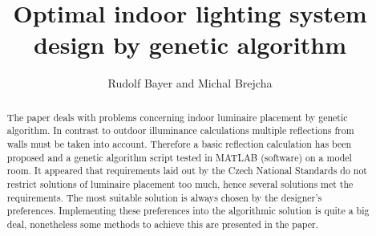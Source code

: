 \documentclass[Afour,sagev,times,doublespace]{sagej}
\begin{document}

\title{Optimal indoor lighting system design by genetic algorithm}

\author{Rudolf Bayer and Michal Brejcha}




\begin{abstract}
The paper deals with problems concerning indoor luminaire placement by genetic algorithm. In contrast to outdoor illuminance calculations multiple reflections from walls must be taken into account. Therefore a basic reflection calculation has been proposed and a genetic algorithm script tested in MATLAB (software) on a model room. It appeared that requirements laid out by the Czech National Standards do not restrict solutions of luminaire placement too much, hence several solutions met the requirements. The most suitable solution is always chosen by the designer's preferences. Implementing these preferences into the algorithmic solution is quite a big deal, nonetheless some methods to achieve this are presented in the paper.
\end{abstract}


\maketitle









\end{document}
